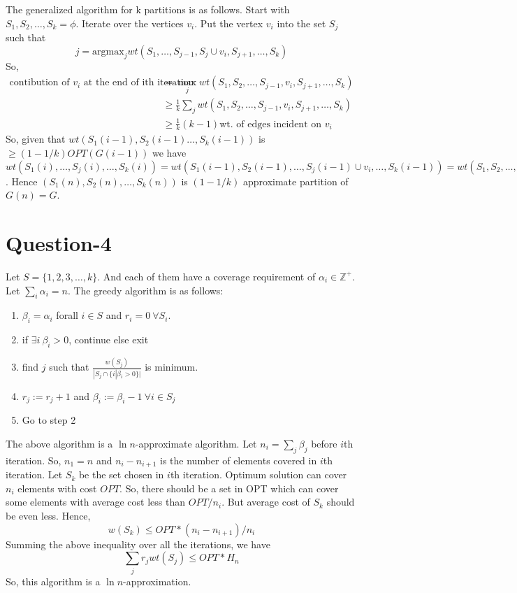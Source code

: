 \documentclass{article}
\newcommand{\set}[1]{\{#1\}}
\begin{document}
The generalized algorithm for k partitions is as follows. Start with $S_1,S_2,\ldots,S_k = \phi$. Iterate over the vertices $v_i$. Put the vertex $v_i$ into the set $S_j$ such that
\begin{equation}
    j = \text{argmax}_j wt(S_1,\ldots,S_{j-1},S_j \cup v_i, S_{j+1},\ldots,S_k)
\end{equation}
So,
\begin{align}
    \text{contibution of $v_i$ at the end of ith iteration} &= \max_{j}wt(S_1,S_2,\ldots,S_{j-1},v_i,S_{j+1},\ldots,S_k) \\
    &\geq \frac{1}{k}\sum_{j}wt(S_1,S_2,\ldots,S_{j-1},v_i,S_{j+1},\ldots,S_k)\\
    &\geq \frac{1}{k}(k-1)\text{wt. of edges incident on }v_i
\end{align}
So, given that $wt(S_1(i-1),S_2(i-1)\ldots,S_k(i-1))$ is $\geq (1-1/k)OPT(G(i-1))$ we have $wt(S_1(i),\ldots,S_j(i),\ldots,S_k(i)) = wt(S_1(i-1),S_2(i-1),\ldots,S_j(i-1)\cup v_i,\ldots,S_k(i-1)) = wt(S_1,S_2,\ldots,S_j,\ldots,S_k) + \text{contr. of }v_i \geq (1-1/k)OPT(G(i-1)) + (1-1/k)\text{wt. of edges incident on }v_i \geq (1-1/k)OPT(G(i))$.
Hence $(S_1(n),S_2(n),\ldots,S_k(n))$ is $(1-1/k)$ approximate partition of $G(n) = G$.
\section{Question-4}
Let $S = \set{1,2,3,\ldots,k}$. And each of them have a coverage requirement of $\alpha_i \in \mathbb{Z}^+$. Let $\sum_{i}\alpha_i = n$. The greedy algorithm is as follows:
\begin{enumerate}
    \item $\beta_i = \alpha_i$ forall $i \in S$ and $r_i = 0\ \forall S_i$.
    \item if $\exists i\ \beta_i > 0$, continue else exit
    \item find $j$ such that $\frac{w(S_j)}{|S_j \cap \set{i|\beta_i > 0}|}$ is minimum.
    \item $r_j := r_j + 1$ and $\beta_i := \beta_i - 1\ \forall i \in S_j$
    \item Go to step 2
\end{enumerate}

The above algorithm is a $\ln n$-approximate algorithm. Let $n_i = \sum_j \beta_j$ before $i$th iteration. So, $n_1 = n$ and $n_{i} - n_{i+1}$ is the number of elements covered in $i$th iteration. Let $S_k$ be the set chosen in $i$th iteration. Optimum solution can cover $n_i$ elements with cost $OPT$. So, there should be a set in OPT which can cover some elements with average cost less than $OPT/n_i$. But average cost of $S_k$ should be even less. Hence,
\begin{equation}
    w(S_k) \leq OPT * (n_{i} - n_{i+1})/n_i
\end{equation}
Summing the above inequality over all the iterations, we have
\begin{equation}
    \sum_{j}r_jwt(S_j) \leq OPT*H_n
\end{equation}
So, this algorithm is a $\ln n$-approximation.
\end{document}
